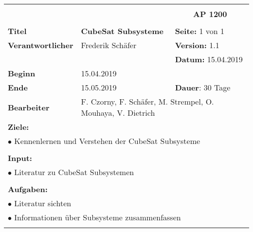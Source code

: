 \clearpage
\begin{table}[!h]
 \begin{center}
  \begin{tabular}{|p{35mm}||p{55mm}|p{50mm}||p{40mm}|}
   \hline
   \multicolumn{3}{|l||}{\textbf{}} & \multicolumn{1}{c|}{}\\
   \multicolumn{3}{|l||}{\textbf{}} & \multicolumn{1}{c|}{\textbf{AP 1200}}\\
   \multicolumn{3}{|l||}{\textbf{}} & \multicolumn{1}{c|}{}\\
   \hline\hline
   \textbf{Titel} & \multicolumn{2}{p{7cm}||}{\textbf{CubeSat Subsysteme}} & \textbf{Seite:} 1 von 1\\
   \hline
   \textbf{Verantwortlicher} & \multicolumn{2}{l||}{Frederik Schäfer} & \textbf{Version:} 1.1\\
   \hline
   \multicolumn{3}{|l||}{} & \textbf{Datum:} 15.04.2019\\
   \hline\hline
   \textbf{Beginn} & \multicolumn{2}{l||}{15.04.2019} & \\
   \hline
   \textbf{Ende} & \multicolumn{2}{l||}{15.05.2019} & \textbf{Dauer}: 30 Tage\\
   \hline\hline
   \textbf{Bearbeiter} & \multicolumn{3}{l|}{F. Czorny, F. Schäfer, M. Strempel, O. Mouhaya, V. Dietrich}\\
   \hline\hline
   \multicolumn{4}{|p{150mm}|}{\textbf{Ziele:}}\\
   \multicolumn{4}{|p{150mm}|}{$\bullet$ Kennenlernen und Verstehen der CubeSat Subsysteme}\\
   \multicolumn{4}{|p{150mm}|}{}\\
   \multicolumn{4}{|p{150mm}|}{\textbf{Input:}}\\
   \multicolumn{4}{|p{150mm}|}{$\bullet$ Literatur zu CubeSat Subsystemen}\\
   \multicolumn{4}{|p{150mm}|}{}\\
   \multicolumn{4}{|p{150mm}|}{\textbf{Aufgaben:}}\\
   \multicolumn{4}{|p{150mm}|}{$\bullet$ Literatur sichten}\\
   \multicolumn{4}{|p{150mm}|}{$\bullet$ Informationen über Subsysteme zusammenfassen}\\
   \multicolumn{4}{|p{150mm}|}{}\\
   \hline
  \end{tabular}
 \end{center}
\end{table}

